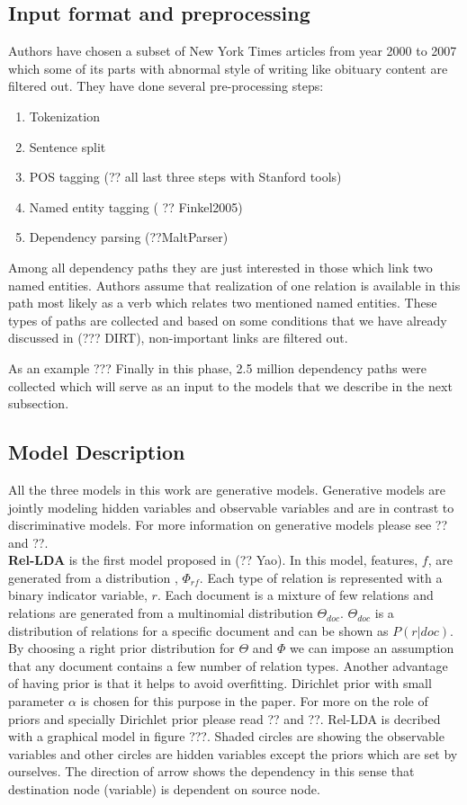 \documentclass[12pt]{report}
\begin{document}
\subsection{Input format and preprocessing}
\label{ch:input}
Authors have chosen a subset of New York Times articles from year 2000 to 2007 which some of its parts with
abnormal style of writing like obituary content are filtered out.
They have done several pre-processing steps:
\begin{enumerate}
\item Tokenization
\item Sentence split
\item POS tagging (?? all last three steps with Stanford tools)
\item Named entity tagging ( ?? Finkel2005)
\item Dependency parsing (??MaltParser)
\end{enumerate}
Among all dependency paths they are just interested in those which link two named entities.
 Authors assume that realization of one relation is available in this 
 path most likely as a verb which relates two mentioned named entities. These types of 
 paths are collected and based on some conditions that we have already discussed in (??? DIRT), non-important links are filtered out.
 
 As an example ???
 Finally in this phase, 2.5 million dependency paths were collected 
 which will serve as an input to the models that we describe in the next subsection.


\subsection {Model Description}
\label{ch:model}
All the three models in this work are generative models. Generative models are jointly modeling hidden variables and observable variables and 
are in contrast to discriminative models. For more information on generative models please see ?? and ??.\\


\textbf{Rel-LDA} is the first model proposed in (?? Yao). 
In this model, features, $f$, are generated from a distribution , $\Phi_{rf}$. Each type
 of relation is represented with a binary indicator variable, $r$. Each document is a mixture of few relations
  and relations are generated from a multinomial distribution $\Theta_{doc}$. $\Theta_{doc}$ is a distribution
  of relations for a specific document and can be shown as $P(r|doc)$. By choosing a right prior distribution for $\Theta$
   and $\Phi$ we can impose an assumption that any document contains a few number of relation types. 
   Another advantage of having prior is that it helps to avoid overfitting. Dirichlet prior with small parameter $\alpha$ is 
   chosen for this purpose in the paper. For more on the role of priors and specially Dirichlet prior
    please read ?? and ??.
    Rel-LDA is decribed with a graphical model in figure ???.
    Shaded circles are showing the observable variables and other circles are hidden variables except 
    the priors which are set by ourselves. The direction of arrow shows the dependency in this sense 
    that destination node (variable) is dependent on source node.
      
\end{document}
